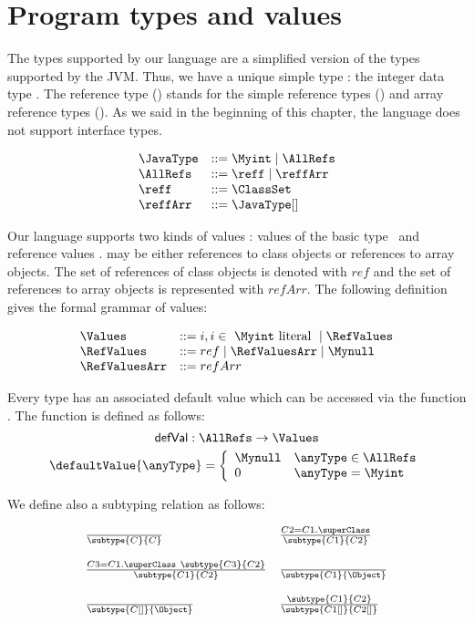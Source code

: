 
\section{Program types and values}\label{types}
 The types supported by our language are a simplified version
 of the types supported by the JVM.
 Thus, we have a unique simple type : the integer data type \Myint.
 The reference type (\AllRefs) stands for the simple reference types ()
 and array reference types ().
 As we said in the beginning of this chapter, the language does not support interface types.

 
$$ \begin{array}{ll}
          \JavaType & ::= \Myint \mid \AllRefs\\
          \AllRefs  & ::= \reff \mid \reffArr \\
	  \reff     & ::= \ClassSet \\
	  \reffArr  & ::= \JavaType[]	  
   \end{array}  $$


Our language supports two kinds of values : values of the basic type \Myint  \ and reference values   \RefValues. \RefValues may be either references to
class objects or references to array objects. The set of references of class objects is denoted with $ref$ and the set of references to array 
objects is represented with $refArr$. The following  definition gives the  formal grammar of values:
 
$$\begin{array}{ll}
             \Values &       ::= i, i \in \  \Myint \  \mbox{\rm literal } \mid \RefValues \\
	     \RefValues &    ::= ref \mid \RefValuesArr  \mid   \Mynull \\  %
	     \RefValuesArr & ::= refArr   %
 \end{array}$$



Every type has an associated default value which can be accessed via
the function . The function is defined as follows:
$$\mbox{\rm\textsf{defVal}} :   \AllRefs    \rightarrow   \Values $$
$$ \defaultValue{\anyType} = 
           \left\{\begin{array}{ll}
	      \Mynull & \anyType \in \AllRefs  \\
	       0 &  \anyType = \Myint
	    \end{array}\right. $$

We define also a subtyping relation as follows:

$$\begin{array}{ll}
  \frac{}{ \subtype{C}{C}} &  
  \frac{   C2 = C1.\superClass  }{\subtype{C1}{C2}} \\  
  & \\
  \frac{ C3 = C1.\superClass \   \subtype{C3}{C2} }{ \subtype{C1}{C2} } &
  \frac{}{  \subtype{C1}{\Object}} \\
  & \\
  \frac{   }{\subtype{C[]}{\Object}} &  
  \frac{ \subtype{C1}{C2}}{\subtype{C1[]}{C2[]}} \\
  \end{array}$$
